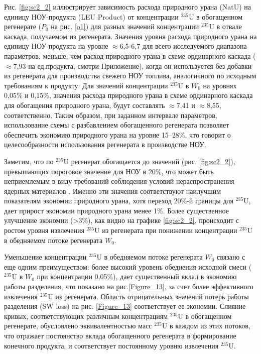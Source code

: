 Рис. \ref{fig:sc2_2} иллюстрирует зависимость расхода природного урана (NatU) на единицу НОУ-продукта (LEU Product) от концентрации $^{235}$U в обогащенном регенерате ($P_0$ на рис. \ref{o1}) для разных значений концентрации $^{235}$U в отвале каскада, получаемом из регенерата. Значения уровня расхода природного урана на единицу НОУ-продукта на уровне $\approx$6,5-6,7 для всего исследуемого диапазона параметров, меньше, чем расход природного урана в схеме ординарного каскада ($\approx$7,93 на ед.продукта, смотри Приложение), когда он используется без добавки из регенерата для производства свежего НОУ топлива, аналогичного по исходным требованиям к продукту. Для значений концентрации $^{235}$U в $W_0$ на уровнях 0,05\% и 0,15\%, значения расхода природного урана в схеме ординарного каскада для обогащения природного урана, будут составлять $\approx$7,41 и $\approx$8,55, соответственно. Таким образом, при заданном интервале параметров, использование схемы с разбавлением обогащенного регенерата позволяет обеспечить экономию природного урана на уровне 15--28\%, что говорит о целесообразности использования регенерата в производстве НОУ.

Заметим, что по $^{235}$U регенерат обогащается до значений (рис.  \ref{fig:sc2_2}), превышающих пороговое значение для НОУ в 20\%, что может быть неприемлемым в виду требований соблюдения условий нераспространения ядерных материалов \cite{brownOriginsSignificanceLimit2016}. Именно эти значения соответствуют наилучшим показателям экономии природного урана, хотя переход 20\%-й границы для $^{235}$U, дает прирост экономии природного урана менее 1\%. Более существенное улучшение экономии (>3\%), как видно на графике \ref{fig:sc2_2}, происходит с ростом уровня извлечения $^{235}$U из регенерата при понижении концентрации $^{235}$U в обедняемом потоке регенерата $W_0$. 

Уменьшение концентрации $^{235}$U в обедняемом потоке регенерата $W_0$ связано с еще одним преимуществом: более высокий уровень обеднения исходной смеси ($^{235}$U в $W_0$ при концентрации 0,05\%), дает существенный вклад в экономию работы разделения, что показано на рис.\ref{Figure_13}, за счет более эффективного извлечения $^{235}$U из регенерата. Область отрицательных значений потерь работы разделения (SW loss) на рис. \ref{Figure_13} соответствует ее экономии. Слияние кривых, соответствующих различным концентрациям $^{235}$U в обогащенном регенерате, обусловлено эквивалентностью масс $^{235}$U в каждом из этих потоков, что отражает постоянство вклада обогащенного регенерата в формирование конечного продукта, и соответствует постоянному уровню извлечения $^{235}$U.

